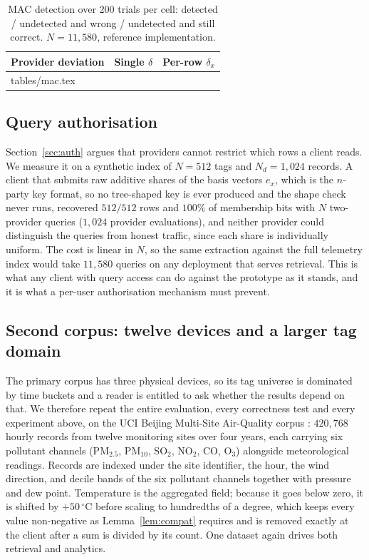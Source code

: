 \documentclass[a4paper,fleqn]{cas-sc}
\begin{document}
\begin{table}[pos=htbp]
\caption{MAC detection over 200 trials per cell: detected / undetected and
wrong / undetected and still correct. $N=11{,}580$, reference
implementation.}
\label{tab:mac}
\centering
\footnotesize
\setlength{\tabcolsep}{3pt}
\begin{tabular*}{\tblwidth}{@{\extracolsep{\fill}}lcc@{}}
\toprule
Provider deviation & Single $\delta$ & Per-row $\delta_x$ \\
\midrule
{} tables/mac.tex 
\bottomrule
\end{tabular*}
\end{table}

\subsection{Query authorisation}
\label{sec:authresult}
Section~\ref{sec:auth} argues that providers cannot restrict which rows a
client reads. We measure it on a synthetic index of $N=512$ tags and
$N_d=1{,}024$ records. A client that submits raw additive shares of the basis
vectors $e_x$, which is the $n$-party key format, so no tree-shaped key is
ever produced and the shape check never runs, recovered $512/512$ rows and
$100\%$ of membership bits with $N$ two-provider queries ($1{,}024$ provider
evaluations), and neither provider could distinguish the queries from honest
traffic, since each share is individually uniform. The cost is linear in $N$,
so the same extraction against the full telemetry index would take $11{,}580$
queries on any deployment that serves retrieval. This is what any client with
query access can do against the prototype as it stands, and it is what a
per-user authorisation mechanism must prevent.

\subsection{Second corpus: twelve devices and a larger tag domain}
\label{sec:secondcorpus}
The primary corpus has three physical devices, so its tag universe is
dominated by time buckets and a reader is entitled to ask whether the results
depend on that. We therefore repeat the entire evaluation, every correctness
test and every experiment above, on the UCI Beijing Multi-Site Air-Quality
corpus \citep{zhang2017cautionary}: $420{,}768$ hourly records from twelve
monitoring sites over four years, each carrying six pollutant channels
(PM$_{2.5}$, PM$_{10}$, SO$_2$, NO$_2$, CO, O$_3$) alongside meteorological
readings. Records are indexed under the site identifier, the hour, the wind
direction, and decile bands of the six pollutant channels together with
pressure and dew point. Temperature is the aggregated field; because it goes
below zero, it is shifted by $+50\,^\circ$C before scaling to hundredths of a
degree, which keeps every value non-negative as Lemma~\ref{lem:compat}
requires and is removed exactly at the client after a sum is divided by its
count. One dataset again drives both retrieval and analytics.
\end{document}
